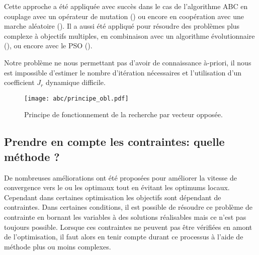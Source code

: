 Cette approche a été appliquée avec succès dans le cas de l’algorithme ABC en couplage
avec un opérateur de mutation (\cite{Bi2011174}) ou encore en coopération avec une marche
aléatoire (\cite{Sharma2012213}).
Il a aussi été appliqué pour résoudre des problèmes plus complexe à objectifs multiples,
en combinaison avec un algorithme évolutionnaire (\cite{Ma201448}), ou encore avec le PSO (\cite{Gao2013114}).

Notre problème ne nous permettant pas d’avoir de connaissance à-priori, il nous est
impossible d’estimer le nombre d’itération nécessaires et l’utilisation d’un coefficient $J_r$
dynamique difficile.

\begin{figure}
    \begin{center}
        \texttt{[image: abc/principe\_obl.pdf]}
    \end{center}
    \caption{Principe de fonctionnement de la recherche par vecteur opposée.
             \label{fig:OBL_method}}
\end{figure}


\subsection{Prendre en compte les contraintes: quelle méthode ?} %
\label{sub:prendre_en_compte_les_contraintes_quelle_methode}

De nombreuses améliorations ont été proposées pour améliorer la vitesse de convergence
vers le ou les optimaux tout en évitant les optimums locaux. Cependant dans certaines
optimisation les objectifs sont dépendant de contraintes. Dans certaines conditions, il
est possible de résoudre ce problème de contrainte en bornant les variables à des solutions
réalisables mais ce n’est pas toujours possible. Lorsque ces contraintes ne peuvent pas être vérifiées
en amont de l’optimisation, il faut alors en tenir compte durant ce processus à l’aide
de méthode plus ou moins complexes.

